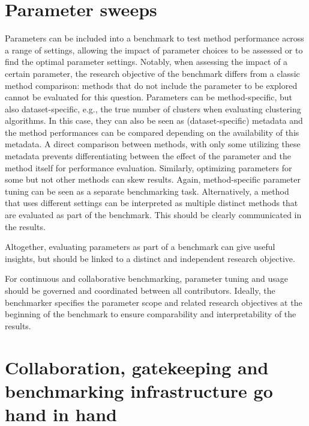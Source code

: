 \documentclass[11pt]{article}
\begin{document}


\section*{Parameter sweeps}

Parameters can be included into a benchmark to test method performance across a range of settings, allowing the impact of parameter choices to be assessed  or to find the optimal parameter settings. Notably, when assessing the impact of a certain parameter, the research objective of the benchmark differs from a classic method comparison: methods that do not include the parameter to be explored cannot be evaluated for this question. Parameters can be method-specific, but also dataset-specific, e.g., the true number of clusters when evaluating clustering algorithms. In this case, they can also be seen as (dataset-specific) metadata and the method performances can be compared depending on the availability of this metadata. A direct comparison between methods, with only some utilizing these metadata prevents differentiating between the effect of the parameter and the method itself for performance evaluation. Similarly, optimizing parameters for some but not other methods can skew results. Again, method-specific parameter tuning can be seen as a separate benchmarking task. Alternatively, a method that uses different settings can be interpreted as multiple distinct methods that are evaluated as part of the benchmark. This should be clearly communicated in the results. 

Altogether, evaluating parameters as part of a benchmark can give useful insights, but should be linked to a distinct and independent research objective.

For continuous and collaborative benchmarking, parameter tuning and usage should be governed and coordinated between all contributors. Ideally, the benchmarker specifies the parameter scope and related research objectives at the beginning of the benchmark to ensure comparability and interpretability of the results. 

\section*{Collaboration, gatekeeping and benchmarking infrastructure go hand in hand}
\end{document}
